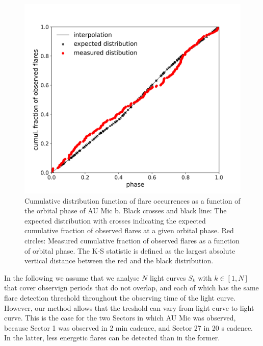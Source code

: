 \documentclass[fleqn,usenatbib,letters]{mnras}%
\begin{document}
\begin{figure}
\includegraphics[width=\hsize]{figures/2021_06_02_AUMic_KS_Test_cumdist_total_Both_Sectors_Orbit.png} 
\caption{Cumulative distribution function of flare occurrences as a function of the orbital phase of AU Mic b. Black crosses and black line: The expected distribution with crosses indicating the expected cumulative fraction of observed flares at a given orbital phase. Red circles: Measured cumulative fraction of observed flares as a function of orbital phase. The K-S statistic is defined as the largest absolute vertical distance between the red and the black distribution.}
\label{fig:cumdist}
\end{figure}


In the following we assume that we analyse $N$ light curves $S_k$ with $k\in [1,N]$ that cover observign periods that do not overlap, and each of which has the same flare detection threshold throughout the observing time of the light curve. However, our method allows that the treshold can vary from light curve to light curve. This is the case for the two Sectors in which AU Mic was observed, because Sector 1 was observed in 2 min cadence, and Sector 27 in 20 s cadence. In the latter, less energetic flares can be detected than in the former.
\end{document}

